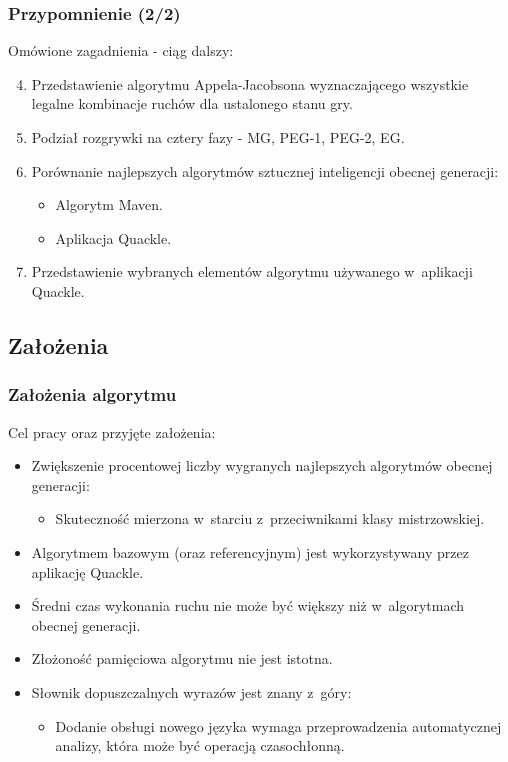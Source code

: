 \documentclass[10pt,a4paper]{beamer}
\begin{document}
\begin{frame}
	\frametitle{Przypomnienie (2/2)}

	Omówione zagadnienia - ciąg dalszy:

	\begin{enumerate}
		\setcounter{enumi}{3}
		\item Przedstawienie algorytmu Appela-Jacobsona wyznaczającego wszystkie legalne kombinacje ruchów dla ustalonego stanu gry.
		\item Podział rozgrywki na cztery fazy - MG, PEG-1, PEG-2, EG.
		\item Porównanie najlepszych algorytmów sztucznej inteligencji obecnej generacji:
			\begin{itemize}
				\item Algorytm Maven.
				\item Aplikacja Quackle.
			\end{itemize}
		\item Przedstawienie wybranych elementów algorytmu używanego w~aplikacji Quackle.
	\end{enumerate}
\end{frame}

\subsection{Założenia}

\begin{frame}[t]
	\frametitle{Założenia algorytmu}
	
	Cel pracy oraz przyjęte założenia:

	\begin{itemize}
		\item Zwiększenie procentowej liczby wygranych najlepszych algorytmów obecnej generacji:
			\begin{itemize}
				\item Skuteczność mierzona w~starciu z~przeciwnikami klasy mistrzowskiej.
			\end{itemize}
		\item Algorytmem bazowym (oraz referencyjnym) jest wykorzystywany przez aplikację Quackle.
		\item Średni czas wykonania ruchu nie może być większy niż w~algorytmach obecnej generacji.
		\item Złożoność pamięciowa algorytmu nie jest istotna.
		\item Słownik dopuszczalnych wyrazów jest znany z~góry:
			\begin{itemize}
				\item Dodanie obsługi nowego języka wymaga przeprowadzenia automatycznej analizy, która może być operacją czasochłonną.
			\end{itemize}
	\end{itemize}
\end{frame}
\end{document}
